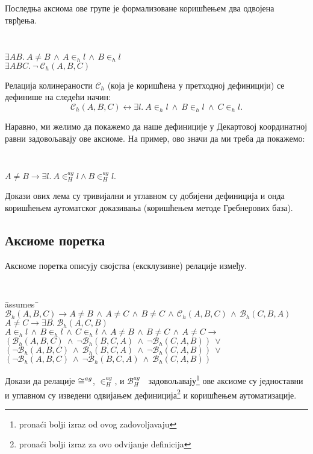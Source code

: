 \documentclass[a4paper, 12pt]{article}
\newcommand{\agbeth}[3]{\ensuremath{\mathcal{B}_H^{\mathit{ag}}\ #1\ #2\ #3}}
\newcommand{\agcongr}[4]{\ensuremath{#1#2 \cong^{ag} #3#4}}
\newcommand{\aginh}[2]{\ensuremath{#1 \in^{ag}_H #2}}
\newcommand{\inh}[2]{\ensuremath{#1 \in_h #2}}
\renewcommand{\beth}[3]{\ensuremath{\mathcal{B}_h(#1, #2, #3)}}
\newcommand{\colinh}[3]{\ensuremath{\mathcal{C}_h(#1, #2, #3)}}
\begin{document}
Последња аксиома ове групе је формализоване коришћењем два одвојена
тврђења.
{\tt
\begin{tabbing}
$\exists A B.\ A \neq B \,\wedge\,\inh{A}{l} \,\wedge\, \inh{B}{l}$\\
$\exists A B C.\ \neg\ \colinh{A}{B}{C}$
\end{tabbing}
}
\noindent Релација колинераности $\mathcal{C}_h$ (која је коришћена у
претходној дефиницији) се дефинише на следећи начин:
$$\colinh{A}{B}{C} \longleftrightarrow \exists
l.\ \inh{A}{l}\ \wedge\ \inh{B}{l}\ \wedge \ \inh{C}{l}.$$

Наравно, ми желимо да покажемо да наше дефиниције у Декартовој
координатној равни задовољавају ове аксиоме. На пример, ово значи да
ми треба да покажемо:

\vspace{-3mm}
{\tt
\begin{tabbing}
$A \neq B \longrightarrow \exists l.\ \aginh{A}{l} \wedge
\aginh{B}{l}.$
\end{tabbing}
}

Докази ових лема су тривијални и углавном су добијени дефиниција и
онда коришћењем аутоматског доказивања (коришћењем методе Гребнерових
база).

\subsection{Аксиоме поретка}
Аксиоме поретка описују својства (ексклузивне) релације између.
{\tt
\begin{tabbing}
\hspace{5mm}\=assumes\ \=\kill
$\beth{A}{B}{C} \longrightarrow A \neq B\,\wedge\,A \neq C\,\wedge\,B \neq C\,\wedge\,\colinh{A}{B}{C}\,\wedge\,\beth{C}{B}{A}$\\
$A \neq C \longrightarrow \exists B.\ \beth{A}{C}{B}$\\
$\inh{A}{l}\,\wedge\,\inh{B}{l}\,\wedge\, \inh{C}{l}\,\wedge\,A \neq B\,\wedge\,B \neq C\,\wedge\,A \neq C \longrightarrow$\\
\> $(\beth{A}{B}{C}\ \wedge\ \neg \beth{B}{C}{A}\ \wedge\ \neg \beth{C}{A}{B}) \ \vee$ \\
\> $(\neg\beth{A}{B}{C}\ \wedge\ \beth{B}{C}{A}\ \wedge\  \neg \beth{C}{A}{B}) \ \vee$\\
\>$(\neg\beth{A}{B}{C}\ \wedge\ \neg \beth{B}{C}{A}\ \wedge\ \beth{C}{A}{B})$
\end{tabbing}
}

Докази да релације $\agcongr{}{}{}$, $\aginh{}{}{}$, и $\agbeth{}{}{}$
задовољавају\footnote{prona\'ci bolji izraz od ovog zadovoljavaju} ове
аксиоме су једноставни и углавном су изведени одвијањем
дефиниција\footnote{prona\'ci bolji izraz za ovo odvijanje definicija}
и коришћењем аутоматизације.
\end{document}
